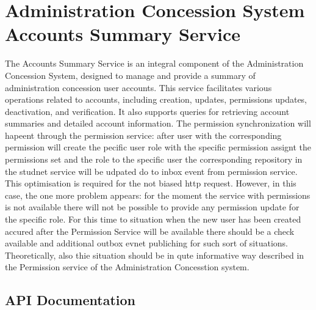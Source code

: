 \documentclass[letterpaper,10pt,english]{sphinxmanual}
\begin{document}
\section{Administration Concession System Accounts Summary Service}
\label{\detokenize{administration_concession_system/accounts_summary_service:administration-concession-system-accounts-summary-service}}\label{\detokenize{administration_concession_system/accounts_summary_service::doc}}
\sphinxAtStartPar
The Accounts Summary Service is an integral component of the Administration Concession System, designed to manage and provide a summary of administration concession user accounts. This service facilitates various operations related to accounts, including creation, updates, permissions updates, deactivation, and verification. It also supports queries for retrieving account summaries and detailed account information.
The permission synchronization will hapeent through the permission service: after user with the corresponding permission will create the pecific user role with the specific permission assignt the permissions set and the role to the specific user the corresponding repository in the studnet service will be udpated do to inbox event from permission service. This optimisation is required for the not biased http request. However, in this case, the one more problem appears: for the moment the service with permissions is not available there will not be possible to provide any permission update for the specific role. For this time to situation when the new user has been created accured after the Permission Service will be available there should be a check available and additional outbox evnet publiching for such sort of situations. Theoretically, also thie situation should be in qute informative way described in the Permission service of the Administration Concesstion system.



\subsection{API Documentation}
\label{\detokenize{administration_concession_system/accounts_summary_service:api-documentation}}
\end{document}
